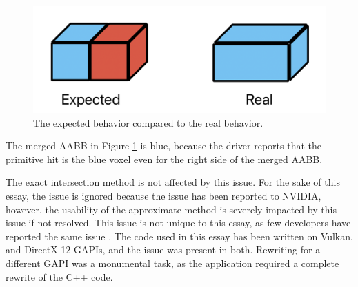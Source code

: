 \documentclass[12pt]{article}
\begin{document}
\begin{figure}[H]
    \begin{center}
        \includegraphics[scale=0.5]{Voxel-Merging}
    \end{center}
    \caption{
        The expected behavior compared to the real behavior.
    }
    \label{fig:Voxel-Merging}
\end{figure}

The merged AABB in Figure \ref{fig:Voxel-Merging} is blue,
because the driver reports that the primitive hit is the blue voxel even for the right side of the merged AABB.

The exact intersection method is not affected by this issue.
For the sake of this essay, the issue is ignored because the issue has been reported to NVIDIA, however,
the usability of the approximate method is severely impacted by this issue if not resolved.
This issue is not unique to this essay, as few developers have reported the same issue \parencite{NVIDIA:AABB-Merging}.
The code used in this essay has been written on Vulkan, and DirectX 12 GAPIs, and the issue was present in both.
Rewriting for a different GAPI was a monumental task, as the application required a complete rewrite of the C++ code.
\end{document}

